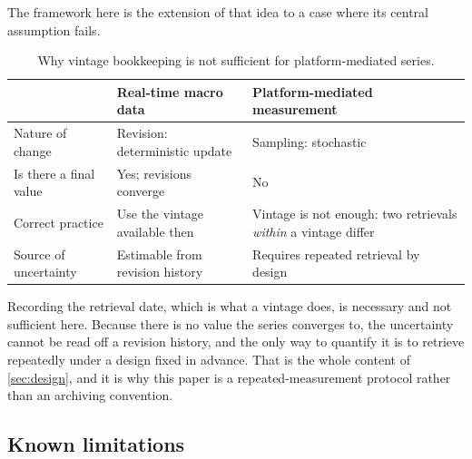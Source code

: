 \documentclass[12pt,a4paper,oneside]{article}
\begin{document}
The framework here is the extension of that idea to a case where its central
assumption fails.

\begin{table}[H]
\centering
\small
\caption{Why vintage bookkeeping is not sufficient for platform-mediated series.}
\label{tab:vintage}
\begin{tabularx}{\textwidth}{lXX}
\toprule
 & Real-time macro data & Platform-mediated measurement\\
\midrule
Nature of change & Revision: deterministic update & Sampling: stochastic\\
Is there a final value & Yes; revisions converge & No\\
Correct practice & Use the vintage available then & Vintage is not enough: two
retrievals \emph{within} a vintage differ\\
Source of uncertainty & Estimable from revision history & Requires repeated
retrieval by design\\
\bottomrule
\end{tabularx}
\end{table}

Recording the retrieval date, which is what a vintage does, is necessary and not
sufficient here. Because there is no value the series converges to, the
uncertainty cannot be read off a revision history, and the only way to quantify it
is to retrieve repeatedly under a design fixed in advance. That is the whole
content of \cref{sec:design}, and it is why this paper is a repeated-measurement
protocol rather than an archiving convention.

\subsection{Known limitations}
\end{document}
